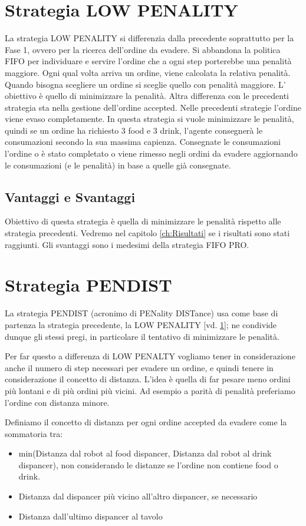 \section{Strategia LOW PENALITY}
\label{sec:lowpen}
La strategia LOW PENALITY si differenzia dalla precedente soprattutto per la Fase 1, ovvero per la ricerca dell'ordine da evadere. Si abbandona la politica FIFO per individuare e servire l'ordine che a ogni step porterebbe una penalità maggiore. Ogni qual volta arriva un ordine, viene calcolata la relativa penalità. Quando bisogna scegliere un ordine si sceglie quello con penalità maggiore. L' obiettivo è quello di minimizzare la penalità.
Altra differenza con le precedenti strategia sta nella gestione dell'ordine accepted. Nelle precedenti strategie l'ordine viene evaso completamente. In questa strategia si vuole minimizzare le penalità, quindi se un ordine ha richiesto 3 food e 3 drink, l'agente consegnerà le consumazioni secondo la sua massima capienza. Consegnate le consumazioni l'ordine o è stato completato o viene rimesso negli ordini da evadere aggiornando le consumazioni (e le penalità) in base a quelle già consegnate.

\subsection{Vantaggi e Svantaggi}
Obiettivo di questa strategia è quella di minimizzare le penalità rispetto alle strategia precedenti. Vedremo nel capitolo \ref{ch:Risultati}  se i risultati sono stati raggiunti. Gli svantaggi sono i medesimi della strategia FIFO PRO.

\section{Strategia PENDIST}
La strategia PENDIST (acronimo di PENality DISTance) usa come base di partenza la strategia precedente, la LOW PENALITY [vd. \ref{sec:lowpen}]; ne condivide dunque gli stessi pregi, in particolare il tentativo di minimizzare le penalità. 

Per far questo a differenza di LOW PENALTY vogliamo tener in considerazione anche il numero di step necessari per evadere un ordine, e quindi tenere in considerazione il concetto di distanza. L'idea è quella di far pesare meno ordini più lontani e di più ordini più vicini. Ad esempio a parità di penalità preferiamo l'ordine con distanza minore.

Definiamo il concetto di distanza per ogni ordine accepted da evadere come la sommatoria tra:
\begin{itemize}
    \item min(Distanza dal robot al food dispancer, Distanza dal robot al drink dispancer), non considerando le distanze se l'ordine non contiene food o drink.
    \item Distanza dal dispancer più vicino all'altro dispancer, se necessario
    \item Distanza dall'ultimo dispancer al tavolo
\end{itemize}

